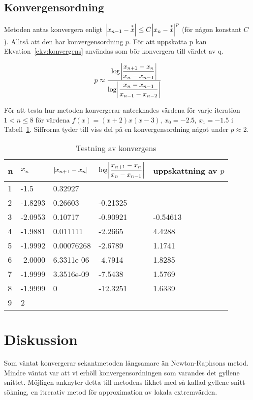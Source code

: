 \documentclass{article}
\DeclarePairedDelimiter\abs{\lvert}{\rvert}
\begin{document}
\subsection{Konvergensordning}
Metoden antas konvergera enligt $\abs*{x_{n-1}-\overset{*}{x}}\leq C\abs*{x_n-\overset{*}{x}}^p$ (för någon konstant $C$). Alltså att den har konvergensordning $p$. För att uppskatta p kan Ekvation~\ref{ekv:konvergens} användas som bör konvergera till värdet av q.

\begin{equation}
  p\approx\dfrac{\log\abs*{\dfrac{x_{n+1}-x_n}{x_n-x_{n-1}}}}{\log\abs*{\dfrac{x_n-x_{n-1}}{x_{n-1}-x_{n-2}}}}
\label{ekv:konvergens}
\end{equation}

För att testa hur metoden konvergerar antecknades värdena för varje iteration $1 < n \leq 8$ för värdena $f(x)=(x+2) x (x-3)$, $x_0=-2.5$, $x_1=-1.5$ i Tabell~\ref{konvergens}. Siffrorna tyder till viss del på en konvergensordning något under $p\approx 2$.

\begin{table}[H]
  \begin{tabu}{l l l l l}
    n & $x_n$ & $\abs{x_{n+1}-x_n}$ & $\log\abs*{\dfrac{x_{n+1}-x_n}{x_n-x_{n-1}}}$ & uppskattning av $p$\\
     & -1.5    & 0.32927 \\
    2 & -1.8293 & 0.26603     & -0.21325 & \\
    3 & -2.0953 & 0.10717     & -0.90921 & -0.54613 \\
    4 & -1.9881 & 0.011111    & -2.2665  & 4.4288 \\
    5 & -1.9992 & 0.00076268  & -2.6789  & 1.1741 \\
    6 & -2.0000 & 6.3311e-06  & -4.7914  & 1.8285 \\
    7 & -1.9999 & 3.3516e-09  & -7.5438  & 1.5769 \\
    8 & -1.9999 & 0           & -12.3251 & 1.6339 \\
    9 & 2
  \end{tabu}
  \caption{Testning av konvergens}\label{konvergens}
\end{table}

\section{Diskussion}
Som väntat konvergerar sekantmetoden långsamare än Newton-Raphsons metod. Mindre väntat var att vi erhöll konvergensordningen som varandes det gyllene snittet. Möjligen anknyter detta till metodens likhet med så kallad gyllene snitt-sökning, en itrerativ metod för approximation av lokala extremvärden. 
\end{document}
